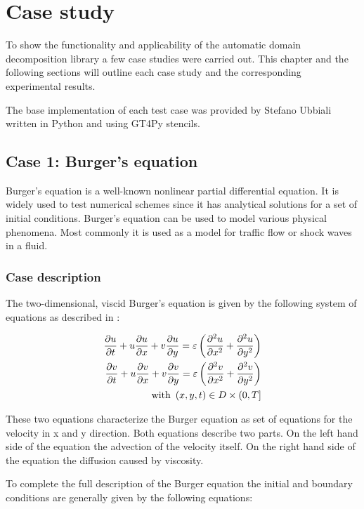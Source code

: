 \section{Case study}

To show the functionality and applicability of the automatic domain decomposition library a few case studies were carried out.
This chapter and the following sections will outline each case study and the corresponding experimental results.

The base implementation of each test case was provided by Stefano Ubbiali written in Python and using GT4Py stencils.

\subsection{Case 1: Burger's equation}
Burger's equation is a well-known nonlinear partial differential equation.
It is widely used to test numerical schemes since it has analytical solutions for a set of initial conditions.
Burger's equation can be used to model various physical phenomena.
Most commonly it is used as a model for traffic flow or shock waves in a fluid.

\subsubsection{Case description}

The two-dimensional, viscid Burger's equation is given by the following system of equations as described in \citet{zhao2011new}:

\begin{equation}
\begin{split}
\frac{\partial u}{\partial t} + u \frac{\partial u}{\partial x} + v \frac{\partial u}{\partial y} = \varepsilon \left( \frac{\partial ^2 u}{\partial x^2} + \frac{\partial ^2 u}{\partial y^2} \right) \\
\frac{\partial v}{\partial t} + u \frac{\partial v}{\partial x} + v \frac{\partial v}{\partial y} = \varepsilon \left( \frac{\partial ^2 v}{\partial x^2} + \frac{\partial ^2 v}{\partial y^2} \right) \\
\text{with } \left(x, y, t\right) \in D \times \left(0,T\right]
\end{split}
\end{equation}

These two equations characterize the Burger equation as set of equations for the velocity in x and y direction.
Both equations describe two parts.
On the left hand side of the equation the advection of the velocity itself.
On the right hand side of the equation the diffusion caused by viscosity.

To complete the full description of the Burger equation the initial and boundary conditions are generally given by the following equations:

